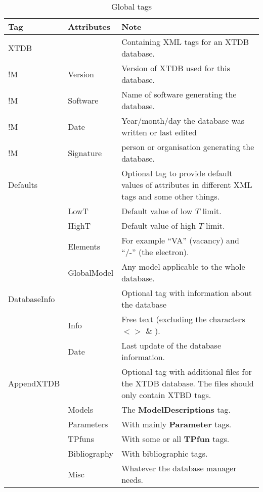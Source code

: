 \documentclass[10pt]{article}
\begin{document}
\begin{table}[!h]
  \caption{Global tags}\label{tab:global}
  \begin{tabular}{|p{} p{} p{}|}\hline
    Tag     & Attributes & Note\\\hline

  XTDB    &         & Containing XML tags for an XTDB database.\\
!M        & Version & Version of XTDB used for this database.\\
!M        &Software & Name of software generating the database.\\
!M        &Date     & Year/month/day the database was written or last edited\\
!M        &Signature & person or organisation generating the database.\\\hline
  
  Defaults & & Optional tag to provide default values of attributes in
               different XML tags and some other things.  \\
           & LowT & Default value of low $T$ limit.\\
           & HighT & Default value of high $T$ limit.\\
         & Elements & For example ``VA'' (vacancy) and ``/-'' (the electron).\\
           & GlobalModel & Any model applicable to the whole database.\\\hline

  DatabaseInfo & & Optional tag with information about the database\\
           & Info & Free text (excluding the characters $< >$ \& ).\\
           & Date & Last update of the database information.\\\hline

  AppendXTDB & & Optional tag with additional files for the XTDB database.  
              The files should only contain XTBD tags.\\
         & Models & The {\bf ModelDescriptions} tag.\\
         & Parameters & With mainly {\bf Parameter} tags.\\
         & TPfuns & With some or all {\bf TPfun} tags.\\
         & Bibliography & With bibliographic tags.\\
         & Misc    & Whatever the database manager needs.\\\hline
  \end{tabular}
\end{table}
\end{document}
